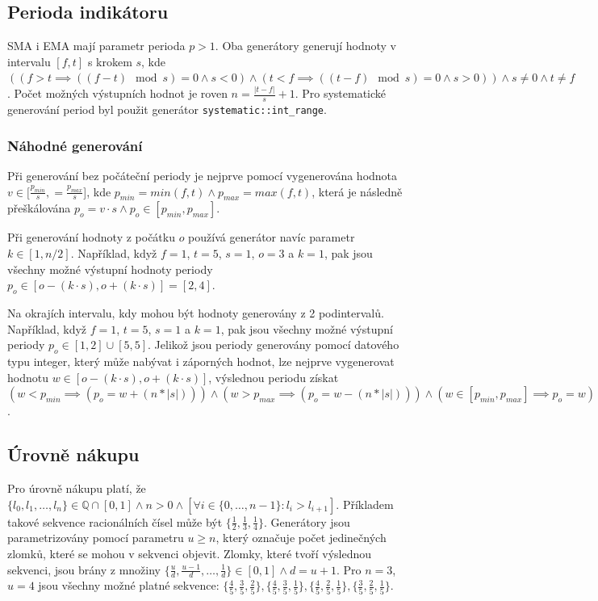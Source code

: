 \subsection{Perioda indikátoru}
SMA i EMA mají parametr perioda $p>1$.
Oba generátory generují hodnoty v intervalu $[f, t]$ s krokem $s$, kde $((f>t\implies((f-t) \mod s)=0 \land s<0) \land (t<f\implies((t-f) \mod s)=0 \land s>0)) \land s\neq0 \land t\neq f$.
Počet možných výstupních hodnot je roven $n=\frac{|t-f|}{s}+1$.
Pro systematické generování period byl použit generátor \texttt{systematic::int\_range}.

\subsubsection{Náhodné generování}
Při generování bez počáteční periody je nejprve pomocí  vygenerována hodnota $ v \in [\frac{p_{min}}{s}, = \frac{p_{max}}{s}$], kde $p_{min}=min(f, t) \land p_{max}=max(f, t)$, která je následně přeškálována $p_o=v\cdot s \land p_o \in [p_{min}, p_{max}]$.

Při generování hodnoty z počátku $o$ používá generátor navíc parametr $k\in[1,n/2]$.
Například, když $f=1$, $t=5$, $s=1$, $o=3$ a $k=1$, pak jsou všechny možné výstupní hodnoty periody $ p_o \in [o-(k\cdot s), o+(k\cdot s)]=[2, 4]$.

Na okrajích intervalu, kdy mohou být hodnoty generovány z 2 podintervalů. Například, když $f=1$, $t=5$, $s=1$ a $k=1$, pak jsou všechny možné výstupní periody $p_o \in [1, 2] \cup [5, 5]$.
Jelikož jsou periody generovány pomocí datového typu integer, který může nabývat i záporných hodnot, lze nejprve vygenerovat hodnotu $ w \in [o-(k\cdot s), o+(k\cdot s)]$, výslednou periodu získat $(w<p_{min}\implies(p_o=w+(n*|s|))) \land (w>p_{max}\implies(p_o=w-(n*|s|))) \land (w \in [p_{min}, p_{max}]\implies p_o=w)$.

\subsection{Úrovně nákupu}
Pro úrovně nákupu platí, že $\{l_0, l_1,\dots,l_n\} \in \mathbb{Q} \cap [0, 1] \land n>0 \land [\forall i \in \{0,\dots,n-1\} : l_i > l_{i+1}]$.
Příkladem takové sekvence racionálních čísel může být $\{\frac{1}{2}, \frac{1}{3}, \frac{1}{4}\}$.
Generátory jsou parametrizovány pomocí parametru $u\geq n$, který označuje počet jedinečných zlomků, které se mohou v sekvenci objevit.
Zlomky, které tvoří výslednou sekvenci, jsou brány z množiny $\{\frac{u}{d}, \frac{u-1}{d},\dots, \frac{1}{d}\} \in [0, 1] \land d=u+1$.
Pro $n=3$, $u=4$ jsou všechny možné platné sekvence: $\{\frac{4}{5}, \frac{3}{5}, \frac{2}{5}\}, \{\frac{4}{5}, \frac{3}{5}, \frac{1}{5}\}, \{\frac{4}{5}, \frac{2}{5}, \frac{1}{5}\}, \{\frac{3}{5}, \frac{2}{5}, \frac{1}{5}\}$.


